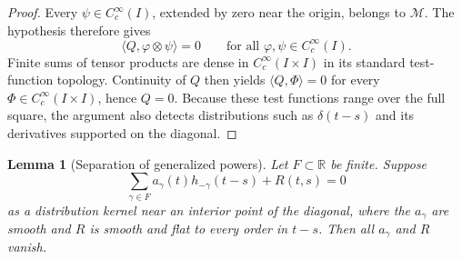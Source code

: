 \documentclass[11pt]{article}
\numberwithin{equation}{section}
\newtheorem{lemma}{Lemma}
\theoremstyle{definition}
\theoremstyle{remark}
\newcommand{\R}{\mathbb R}
\newcommand{\M}{\mathcal M}
\begin{document}
\begin{proof}
Every $\psi\in C_c^\infty(I)$, extended by zero near the origin, belongs to $\M$. The hypothesis therefore gives
\begin{equation*}
\langle Q,\varphi\otimes\psi\rangle=0
\qquad\text{for all }\varphi,\psi\in C_c^\infty(I).
\end{equation*}
Finite sums of tensor products are dense in $C_c^\infty(I\times I)$ in its standard test-function topology. Continuity of $Q$ then yields $\langle Q,\Phi\rangle=0$ for every $\Phi\in C_c^\infty(I\times I)$, hence $Q=0$. Because these test functions range over the full square, the argument also detects distributions such as $\delta(t-s)$ and its derivatives supported on the diagonal.
\end{proof}

\begin{lemma}[Separation of generalized powers]\label{lem:separation}
Let $F\subset\R$ be finite. Suppose
\begin{equation}
\sum_{\gamma\in F}a_\gamma(t)h_{-\gamma}(t-s)+R(t,s)=0
\label{eq:separation}
\end{equation}
as a distribution kernel near an interior point of the diagonal, where the $a_\gamma$ are smooth and $R$ is smooth and flat to every order in $t-s$. Then all $a_\gamma$ and $R$ vanish.
\end{lemma}
\end{document}
